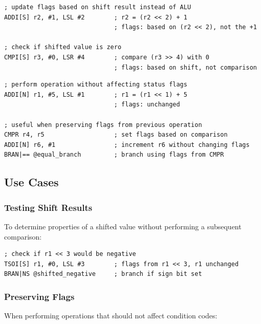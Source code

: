 \begin{example}
	\begin{lstlisting}
; update flags based on shift result instead of ALU
ADDI[S] r2, #1, LSL #2        ; r2 = (r2 << 2) + 1
                              ; flags: based on (r2 << 2), not the +1

; check if shifted value is zero
CMPI[S] r3, #0, LSR #4        ; compare (r3 >> 4) with 0
                              ; flags: based on shift, not comparison
	\end{lstlisting}
	\caption{Shift Flag Override}
\end{example}

\begin{example}
	\begin{lstlisting}
; perform operation without affecting status flags
ADDI[N] r1, #5, LSL #1        ; r1 = (r1 << 1) + 5
                              ; flags: unchanged

; useful when preserving flags from previous operation
CMPR r4, r5                   ; set flags based on comparison
ADDI[N] r6, #1                ; increment r6 without changing flags
BRAN|== @equal_branch         ; branch using flags from CMPR
	\end{lstlisting}
	\caption{No Flag Update}
\end{example}

\subsection{Use Cases}

\subsubsection{Testing Shift Results}

To determine properties of a shifted value without performing a subsequent comparison:

\begin{lstlisting}
; check if r1 << 3 would be negative
TSOI[S] r1, #0, LSL #3        ; flags from r1 << 3, r1 unchanged
BRAN|NS @shifted_negative     ; branch if sign bit set
\end{lstlisting}

\subsubsection{Preserving Flags}

When performing operations that should not affect condition codes:

